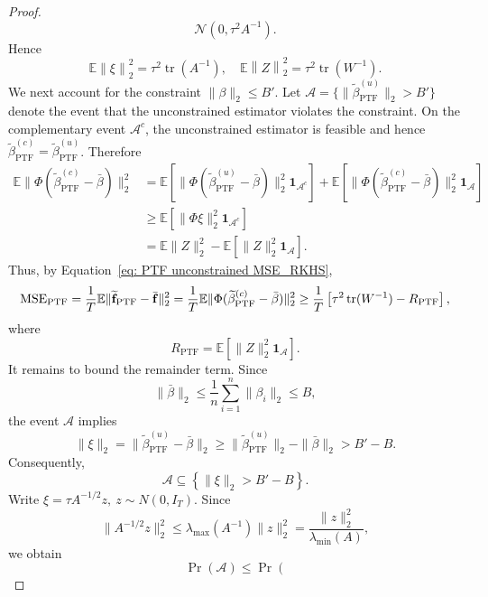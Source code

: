 \begin{proof}
\[\mathcal{N}(0,\tau^2 A^{-1}).
\]
Hence
\begin{equation}
\mathbb E
\left\|
\xi
\right\|_2^2
=
\tau^2\operatorname{tr}(A^{-1}),\quad
\mathbb E
\left\|
Z
\right\|_2^2
=
\tau^2\operatorname{tr}(W^{-1}).
\label{eq: PTF unconstrained MSE_RKHS}
\end{equation}
We next account for the constraint $\|\beta\|_2\le B'$. 
Let $\mathcal A=\{\|\widetilde\beta_{\mathrm{PTF}}^{(u)}\|_2>B'\}$ denote the event that the unconstrained estimator violates the constraint. On the complementary event $\mathcal A^c$, the unconstrained estimator is feasible and hence
$\widetilde\beta_{\mathrm{PTF}}^{(c)}
=
\widetilde\beta_{\mathrm{PTF}}^{(u)}$. Therefore
\[
\begin{aligned}
\mathbb E\|\Phi(\widetilde\beta_{\mathrm{PTF}}^{(c)}-\bar\beta)\|_2^2
&=
\mathbb E[
\|\Phi(\widetilde\beta_{\mathrm{PTF}}^{(u)}-\bar\beta)\|_2^2
\mathbf 1_{\mathcal A^c}]
+
\mathbb E[
\|\Phi(\widetilde\beta_{\mathrm{PTF}}^{(c)}-\bar\beta)\|_2^2
\mathbf 1_{\mathcal A}]
\\
&\geq
\mathbb E[
\|\Phi\xi\|_2^2
\mathbf 1_{\mathcal A^c}]
\\
&=
\mathbb E\|Z\|_2^2
-
\mathbb E[
\|Z\|_2^2
\mathbf 1_{\mathcal A}].
\end{aligned}
\]
Thus, by Equation~\eqref{eq: PTF unconstrained MSE_RKHS},
\begin{equation}
\begin{aligned}
    \operatorname{MSE}_{\mathrm{PTF}}
    =
    \dfrac{1}{T}\mathbb{E} 
    \|\widetilde{\mathbf{f}}_{\mathrm{PTF}} - \bar{\mathbf{f}}\|_2^2
    =
    \dfrac{1}{T}\mathbb{E} 
    \|\Phi(\widetilde\beta_{\mathrm{PTF}}^{(c)}-\bar\beta)\|_2^2
    \geq
    \dfrac{1}{T}\left[{\tau^2\operatorname{tr}(W^{-1})
    -
    R_{\mathrm{PTF}}}\right],
\end{aligned}
\label{eq: PTF remainder decomposition_RKHS}
\end{equation}
where
\[
R_{\mathrm{PTF}}
=
\mathbb E[
\|Z\|_2^2
\mathbf 1_{\mathcal A}].
\]
It remains to bound the remainder term. Since
\[
\|\bar\beta\|_2\le \dfrac{1}{n}\sum_{i=1}^n\|\beta_i\|_2\leq B,
\]
the event $\mathcal A$ implies
\[
\|\xi\|_2
=
\|\widetilde\beta_{\mathrm{PTF}}^{(u)}-\bar\beta\|_2
\geq
\|\widetilde\beta_{\mathrm{PTF}}^{(u)}\|_2-\|\bar\beta\|_2
>
B'-B.
\]
Consequently,
\[
\mathcal A
\subseteq
\left\{
\|\xi\|_2>B'-B
\right\}.
\]
Write $\xi=\tau A^{-1/2}z,\ z\sim N(0,I_T)$. Since
\[
\|A^{-1/2}z\|_2^2
\leq
\lambda_{\max}(A^{-1})\|z\|_2^2
=
\frac{\|z\|_2^2}
{\lambda_{\min}(A)},
\]
we obtain
\[
\Pr(\mathcal A)
\leq
\Pr\left(
\]
\end{proof}
